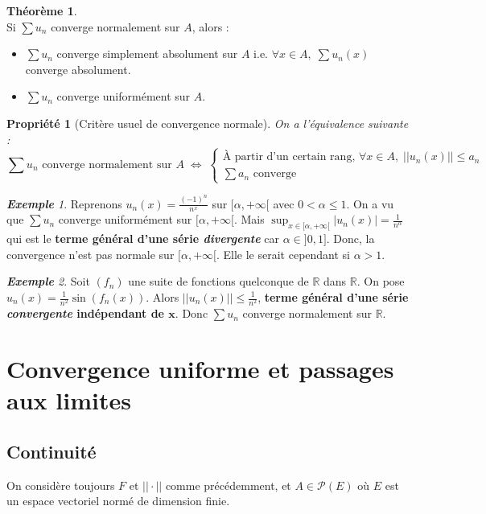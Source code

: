 \documentclass[12pt]{book}
\let\ensembleNombre\mathbb
\newcommand*\R{\ensuremath{\ensembleNombre{R}}}
\newtheorem*{prop}{Propriété}
\theoremstyle{definition}
\newtheorem{thme}{Théorème}[chapter]
\theoremstyle{remark}
\newtheorem*{ex}{\textbf{Exemple}}
\newenvironment{fthme}
  {\begin{mdframed}[roundcorner=10pt, linewidth=2pt]\begin{thme}}
  {\end{thme}\end{mdframed}}
\begin{document}
	\begin{fthme}\mbox{~}\\
	Si $\sum u_n$ converge normalement sur $A$, alors :
	\begin{itemize}
	\item $\sum u_n$ converge simplement absolument sur $A$ i.e. $\forall x \in A,\; \sum u_n(x)$ converge absolument.
	\item $\sum u_n$ converge uniformément sur $A$.
	\end{itemize}
	\end{fthme}
	
	\begin{prop}[Critère usuel de convergence normale]
	On a l'équivalence suivante :
	\[\boxed{ \sum u_n \text{ converge normalement sur } A \;\Longleftrightarrow\; \begin{cases}
		\text{À partir d'un certain rang, } \forall x \in A, \; ||u_n(x)|| \leq a_n\\
		\sum a_n \text{ converge}
	   \end{cases} }\]
	\end{prop}
	
	\begin{ex}
	Reprenons $u_n(x) = \frac{(-1)^n}{n^x}$ sur $[\alpha, +\infty[$ avec $0 < \alpha \leq 1$. On a vu que $\sum u_n$ converge uniformément sur $[\alpha, +\infty[$. Mais $\sup_{x \in [\alpha, +\infty[} |u_n(x)| = \frac{1}{n^\alpha}$ qui est le \textbf{terme général d'une série \emph{divergente}} car $\alpha \in ]0,1]$. Donc, la convergence n'est pas normale sur $[\alpha, +\infty[$. Elle le serait cependant si $\alpha > 1$.
	\end{ex}
	
	\begin{ex}
	Soit $(f_n)$ une suite de fonctions quelconque de $\R$ dans $\R$. On pose $u_n(x) = \frac{1}{n^2}\sin (f_n(x))$. Alors $||u_n(x)|| \leq \frac{1}{n^2}$, \textbf{terme général d'une série \emph{convergente} indépendant de $\bm{x}$}. Donc $\sum u_n$ converge normalement sur $\R$.
	\end{ex}
	
	\section{Convergence uniforme et passages aux limites}
		\subsection{Continuité}
	On considère toujours $F$ et $||\cdot||$ comme précédemment, et $A \in \mathcal P(E)$ où $E$ est un espace vectoriel normé de dimension finie.
	
\end{document}
